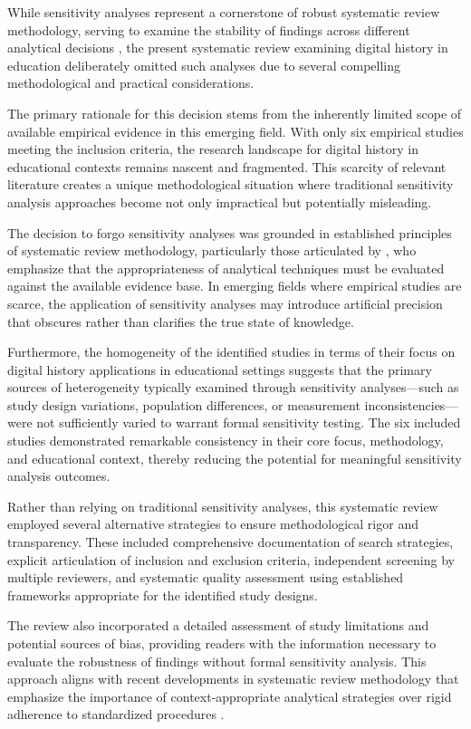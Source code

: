 \documentclass[
hf,
]{ceurart}
\begin{document}
While sensitivity analyses represent a cornerstone of robust systematic review methodology, serving to examine the stability of findings across different analytical decisions , the present systematic review examining digital history in education deliberately omitted such analyses due to several compelling methodological and practical considerations.

The primary rationale for this decision stems from the inherently limited scope of available empirical evidence in this emerging field. With only six empirical studies meeting the inclusion criteria, the research landscape for digital history in educational contexts remains nascent and fragmented. This scarcity of relevant literature creates a unique methodological situation where traditional sensitivity analysis approaches become not only impractical but potentially misleading.

The decision to forgo sensitivity analyses was grounded in established principles of systematic review methodology, particularly those articulated by \citet{petticrew2008systematic}, who emphasize that the appropriateness of analytical techniques must be evaluated against the available evidence base. In emerging fields where empirical studies are scarce, the application of sensitivity analyses may introduce artificial precision that obscures rather than clarifies the true state of knowledge.

Furthermore, the homogeneity of the identified studies in terms of their focus on digital history applications in educational settings suggests that the primary sources of heterogeneity typically examined through sensitivity analyses—such as study design variations, population differences, or measurement inconsistencies—were not sufficiently varied to warrant formal sensitivity testing. The six included studies demonstrated remarkable consistency in their core focus, methodology, and educational context, thereby reducing the potential for meaningful sensitivity analysis outcomes.

Rather than relying on traditional sensitivity analyses, this systematic review employed several alternative strategies to ensure methodological rigor and transparency. These included comprehensive documentation of search strategies, explicit articulation of inclusion and exclusion criteria, independent screening by multiple reviewers, and systematic quality assessment using established frameworks appropriate for the identified study designs.

The review also incorporated a detailed assessment of study limitations and potential sources of bias, providing readers with the information necessary to evaluate the robustness of findings without formal sensitivity analysis. This approach aligns with recent developments in systematic review methodology that emphasize the importance of context-appropriate analytical strategies over rigid adherence to standardized procedures \citep{munn2018systematic}.
\end{document}
